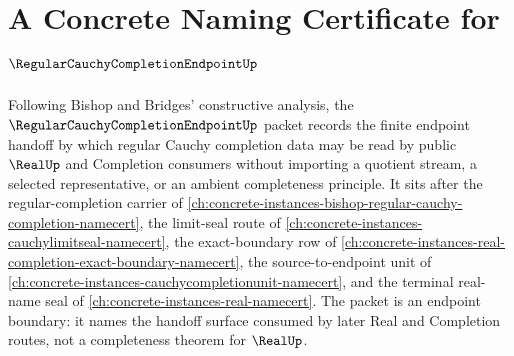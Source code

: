 \chapter{A Concrete Naming Certificate for $\RegularCauchyCompletionEndpointUp$}
\label{ch:concrete-instances-regular-cauchy-completion-endpoint-namecert}

Following Bishop and Bridges' constructive analysis, the $\RegularCauchyCompletionEndpointUp$ packet records the finite endpoint handoff by which regular Cauchy completion data may be read by public $\RealUp$ and Completion consumers without importing a quotient stream, a selected representative, or an ambient completeness principle. It sits after the regular-completion carrier of \autoref{ch:concrete-instances-bishop-regular-cauchy-completion-namecert}, the limit-seal route of \autoref{ch:concrete-instances-cauchylimitseal-namecert}, the exact-boundary row of \autoref{ch:concrete-instances-real-completion-exact-boundary-namecert}, the source-to-endpoint unit of \autoref{ch:concrete-instances-cauchycompletionunit-namecert}, and the terminal real-name seal of \autoref{ch:concrete-instances-real-namecert}. The packet is an endpoint boundary: it names the handoff surface consumed by later Real and Completion routes, not a completeness theorem for $\RealUp$.


